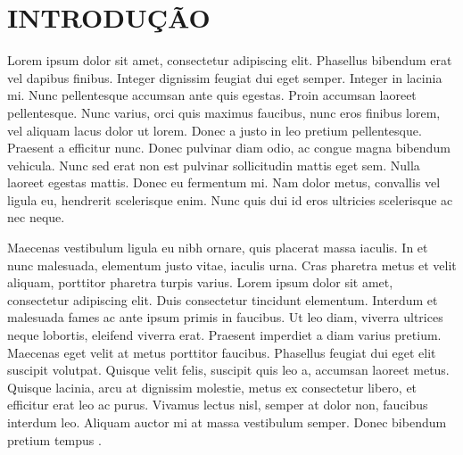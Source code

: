\chapter{INTRODUÇÃO}\label{ch:introducao}

Lorem ipsum dolor sit amet, consectetur adipiscing elit. Phasellus bibendum erat vel dapibus finibus. Integer dignissim feugiat dui eget semper. Integer in lacinia mi. Nunc pellentesque accumsan ante quis egestas. Proin accumsan laoreet pellentesque. Nunc varius, orci quis maximus faucibus, nunc eros finibus lorem, vel aliquam lacus dolor ut lorem. Donec a justo in leo pretium pellentesque. Praesent a efficitur nunc. Donec pulvinar diam odio, ac congue magna bibendum vehicula. Nunc sed erat non est pulvinar sollicitudin mattis eget sem. Nulla laoreet egestas mattis. Donec eu fermentum mi. Nam dolor metus, convallis vel ligula eu, hendrerit scelerisque enim. Nunc quis dui id eros ultricies scelerisque ac nec neque.

Maecenas vestibulum ligula eu nibh ornare, quis placerat massa iaculis. In et nunc malesuada, elementum justo vitae, iaculis urna. Cras pharetra metus et velit aliquam, porttitor pharetra turpis varius. Lorem ipsum dolor sit amet, consectetur adipiscing elit. Duis consectetur tincidunt elementum. Interdum et malesuada fames ac ante ipsum primis in faucibus. Ut leo diam, viverra ultrices neque lobortis, eleifend viverra erat. Praesent imperdiet a diam varius pretium. Maecenas eget velit at metus porttitor faucibus. Phasellus feugiat dui eget elit suscipit volutpat. Quisque velit felis, suscipit quis leo a, accumsan laoreet metus. Quisque lacinia, arcu at dignissim molestie, metus ex consectetur libero, et efficitur erat leo ac purus. Vivamus lectus nisl, semper at dolor non, faucibus interdum leo. Aliquam auctor mi at massa vestibulum semper. Donec bibendum pretium tempus \cite{andrienko2012visual}.